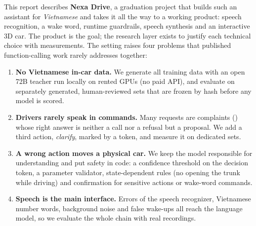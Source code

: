 This report describes \textbf{Nexa Drive}, a graduation project that builds such an assistant for \emph{Vietnamese} and takes
it all the way to a working product: speech recognition, a wake word, runtime guardrails, speech synthesis and an interactive
3D car. The product is the goal; the research layer exists to justify each technical choice with measurements. The setting
raises four problems that published function-calling work rarely addresses together:
\begin{enumerate}
  \item \textbf{No Vietnamese in-car data.} We generate all training data with an open 72B teacher run locally on rented
  GPUs (no paid API), and evaluate on separately generated, human-reviewed sets that are frozen by hash before any model is
  scored.
  \item \textbf{Drivers rarely speak in commands.} Many requests are complaints () whose right
  answer is neither a call nor a refusal but a proposal. We add a third action, \emph{clarify}, marked by a
   token, and measure it on dedicated sets.
  \item \textbf{A wrong action moves a physical car.} We keep the model responsible for understanding and put safety in
  code: a confidence threshold on the decision token, a parameter validator, state-dependent rules (no opening the trunk
  while driving) and confirmation for sensitive actions or wake-word commands.
  \item \textbf{Speech is the main interface.} Errors of the speech recognizer, Vietnamese number words, background noise
  and false wake-ups all reach the language model, so we evaluate the whole chain with real recordings.
\end{enumerate}

